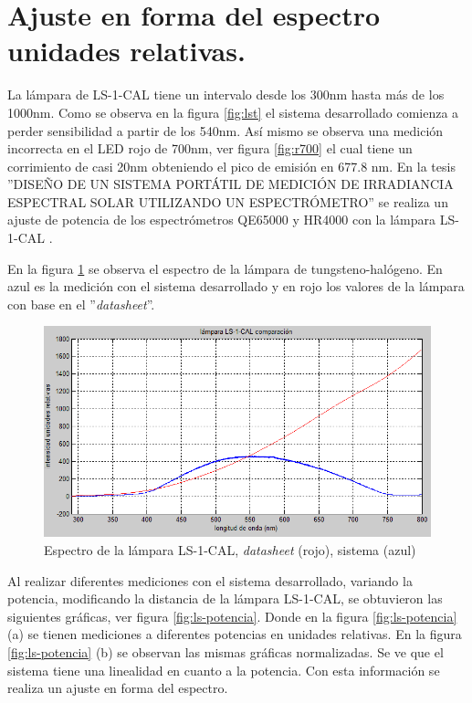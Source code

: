 \newpage
\section{Ajuste en forma del espectro unidades relativas.}
La lámpara de LS-1-CAL tiene un intervalo desde los 300nm hasta más de los 1000nm. Como se observa en la figura \ref{fig:lst} el sistema desarrollado comienza a perder sensibilidad a partir de los 540nm. Así mismo se observa una medición incorrecta en el LED rojo de 700nm, ver figura \ref{fig:r700} el cual tiene un corrimiento de casi 20nm obteniendo el pico de emisión en 677.8 nm. 
En la tesis ''DISEÑO DE UN SISTEMA PORTÁTIL DE MEDICIÓN
DE IRRADIANCIA ESPECTRAL SOLAR
UTILIZANDO UN ESPECTRÓMETRO'' se realiza un ajuste de potencia de los espectrómetros QE65000 y HR4000 con la lámpara LS-1-CAL \cite{DeInvestigacion2020}. 

En la figura \ref{fig:ls-s-ds} se observa el espectro de la lámpara de tungsteno-halógeno. En azul es la medición con el sistema desarrollado y en rojo los valores de la lámpara con base en el ''\textit{datasheet}''.

\begin{figure}[h]
	\centering
	\includegraphics[width=0.9\linewidth]{Imagenes/4/LS-S-DS}
	\caption[Espectro de la lámpara LS-1-CAL, \textit{datasheet} (rojo), sistema (azul)]{Espectro de la lámpara LS-1-CAL, \textit{datasheet} (rojo), sistema (azul)}
	\label{fig:ls-s-ds}
\end{figure}

Al realizar diferentes mediciones con el sistema desarrollado, variando la potencia, modificando la distancia de la lámpara LS-1-CAL, se obtuvieron las siguientes gráficas, ver figura \ref{fig:ls-potencia}. Donde en la figura \ref{fig:ls-potencia} (a) se tienen mediciones a diferentes potencias en unidades relativas. En la figura \ref{fig:ls-potencia} (b) se observan las mismas gráficas normalizadas. Se ve que el sistema tiene una linealidad en cuanto a la potencia. Con esta información se realiza un ajuste en forma del espectro.  

